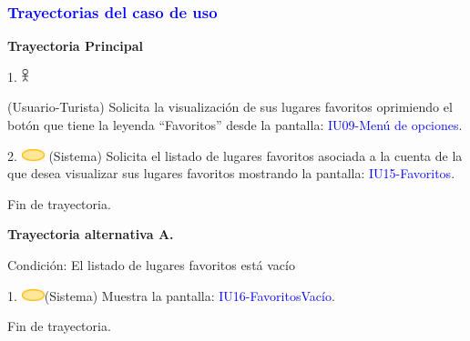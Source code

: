 \pagebreak
\subsubsection{\textcolor{blue}{Trayectorias del caso de uso}}
\textbf{Trayectoria Principal}{

     1. \includegraphics[width=0.0150\textwidth]{Figuras/persona.png}{
        (Usuario-Turista)
        Solicita la visualización de sus lugares favoritos oprimiendo el botón que tiene la leyenda “Favoritos” desde la pantalla: \textcolor{blue}{IU09-Menú de opciones}.
     
     }
    
      2. \includegraphics[width=0.0500\textwidth]{Figuras/sistema.png} {
        (Sistema) Solicita el listado de lugares favoritos asociada a la cuenta de la que desea visualizar sus lugares favoritos mostrando la pantalla: \textcolor{blue}{IU15-Favoritos}.
      }

      Fin de trayectoria.
}


\par
\vspace{1cm}
\textbf{Trayectoria alternativa A.}{
    {\scriptsize Condición: El listado de lugares favoritos está vacío}
    \par
    1. \includegraphics[width=0.05\textwidth]{Figuras/sistema.png}{(Sistema) Muestra la pantalla: \textcolor{blue}{IU16-FavoritosVacío}.
    }
    \par
    Fin de trayectoria.
}



